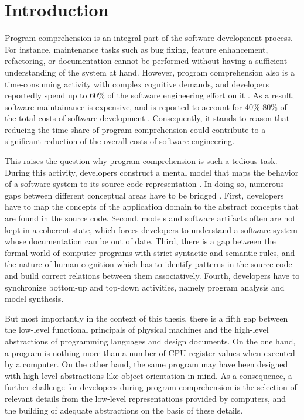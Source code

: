 \chapter{Introduction}
\label{c:introduction}
Program comprehension is an integral part of the software development process.
For instance, maintenance tasks such as bug fixing, feature enhancement, refactoring, or documentation cannot be performed without having a sufficient understanding of the system at hand.
However, program comprehension also is a time-consuming activity with complex cognitive demands, and developers reportedly spend up to 60\% of the software engineering effort on it \cite{corbi_program_1989, basili_evolving_1997, ducasse_class_2005, rothlisberger_feature_2007, cornelissen_execution_2008}.
As a result, software maintainance is expensive, and is reported to account for 40\%-80\% of the total costs of software development \cite{glass_frequently_2001}.
Consequently, it stands to reason that reducing the time share of program comprehension could contribute to a significant reduction of the overall costs of software engineering.

This raises the question why program comprehension is such a tedious task.
During this activity, developers construct a mental model that maps the behavior of a software system to its source code representation \cite{latoza_maintaining_2006}.
In doing so, numerous gaps between different conceptual areas have to be bridged \cite{kent_program_1996}.
First, developers have to map the concepts of the application domain to the abstract concepts that are found in the source code.
Second, models and software artifacts often are not kept in a coherent state, which forces developers to understand a software system whose documentation can be out of date.
Third, there is a gap between the formal world of computer programs with strict syntactic and semantic rules, and the nature of human cognition which has to identify patterns in the source code and build correct relations between them associatively.
Fourth, developers have to synchronize bottom-up and top-down activities, namely program analysis and model synthesis.

But most importantly in the context of this thesis, there is a fifth gap between the low-level functional principals of physical machines and the high-level abstractions of programming languages and design documents.
On the one hand, a program is nothing more than a number of CPU register values when executed by a computer.
On the other hand, the same program may have been designed with high-level abstractions like object-orientation in mind.
As a consequence, a further challenge for developers during program comprehension is the selection of relevant details from the low-level representations provided by computers, and the building of adequate abstractions on the basis of these details.

